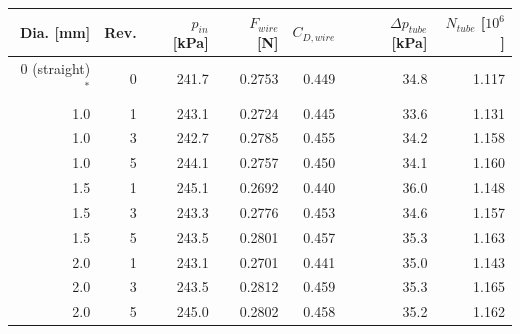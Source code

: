 \begin{tabular}{rrrrrrr}
\toprule
Dia. [mm] & Rev. & $p_{in}$ [kPa] & $F_{wire}$ [N] & $C_{D,wire}$ & $\Delta p_{tube}$ [kPa] & $N_{tube}$ [$10^6$]\\
\midrule
0 (straight)$^{*}$ & 0 & 241.7 & 0.2753 & 0.449 & 34.8 & 1.117\\
1.0 & 1 & 243.1 & 0.2724 & 0.445 & 33.6 & 1.131\\
1.0 & 3 & 242.7 & 0.2785 & 0.455 & 34.2 & 1.158\\
1.0 & 5 & 244.1 & 0.2757 & 0.450 & 34.1 & 1.160\\
1.5 & 1 & 245.1 & 0.2692 & 0.440 & 36.0 & 1.148\\
1.5 & 3 & 243.3 & 0.2776 & 0.453 & 34.6 & 1.157\\
1.5 & 5 & 243.5 & 0.2801 & 0.457 & 35.3 & 1.163\\
2.0 & 1 & 243.1 & 0.2701 & 0.441 & 35.0 & 1.143\\
2.0 & 3 & 243.5 & 0.2812 & 0.459 & 35.3 & 1.165\\
2.0 & 5 & 245.0 & 0.2802 & 0.458 & 35.2 & 1.162\\
\bottomrule
\end{tabular}
